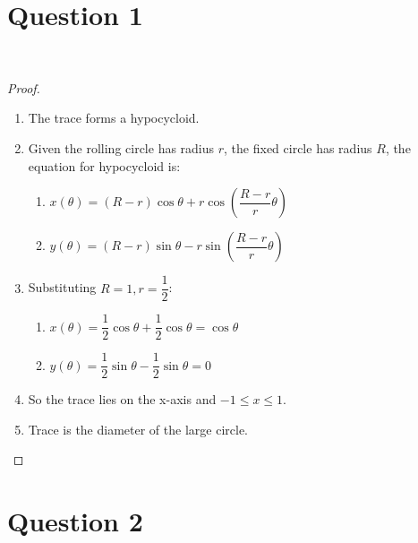 \documentclass{article}
\begin{document}
\section*{Question 1}

~

\begin{proof}
    ~
    \begin{enumerate}
        \item The trace forms a hypocycloid.
        \item Given the rolling circle has radius $r$, the fixed circle has radius $R$, the equation for hypocycloid is:
        \begin{enumerate}
            \item[] $x(\theta)=(R-r)\cos\theta+r\cos\left(\dfrac{R-r}{r}\theta\right)$
            \item[] $y(\theta)=(R-r)\sin\theta-r\sin\left(\dfrac{R-r}{r}\theta\right)$
        \end{enumerate}
        \item Substituting $R=1,r=\dfrac{1}{2}$:
        \begin{enumerate}
            \item[]  $x(\theta)=\dfrac{1}{2}\cos\theta+\dfrac{1}{2}\cos\theta=\cos\theta$
            \item[]  $y(\theta)=\dfrac{1}{2}\sin\theta-\dfrac{1}{2}\sin\theta=0$
        \end{enumerate}
        \item So the trace lies on the x-axis and $-1\leq x\leq 1$.
        \item Trace is the diameter of the large circle.
    \end{enumerate}
\end{proof}

\newpage

\section*{Question 2}

~
\end{document}
